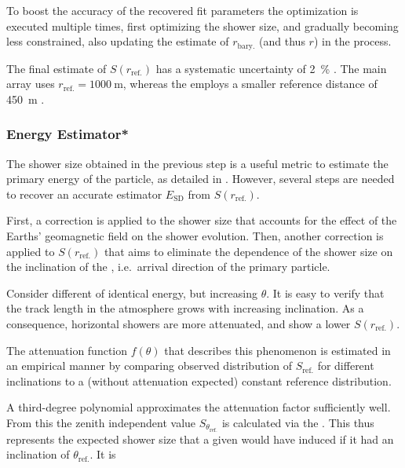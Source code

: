 To boost the accuracy of the recovered fit parameters the optimization is 
executed multiple times, first optimizing the shower size, and gradually 
becoming less constrained, also updating the estimate of $r_\mathrm{bary.}$
(and thus $r$) in the process.

The final estimate of $S(r_\mathrm{ref.})$ has a systematic uncertainty of 
\SI{2}{\percent} \cite{ghiaStatisticalSystematicUncertainties2005}. The main 
array uses $r_\mathrm{ref.} = \SI{1000}{\meter}$, whereas the  employs
a smaller reference distance of \SI{450}{\meter} 
\cite{sanchezAMIGADetectorPierre2011}.

\subsubsection{Energy Estimator*}
\label{sssec:sd-reconstruction-energy-estimator}

The shower size obtained in the previous step is a useful metric to estimate 
the primary energy of the \CR particle, as detailed in 
\cite{aabReconstructionEventsRecorded2020}. However, several steps are needed
to recover an accurate estimator $E_\mathrm{SD}$ from $S(r_\mathrm{ref.})$. 

First, a correction is applied to the shower size that accounts for the effect 
of the Earths' geomagnetic field on the shower evolution. Then, another 
correction is applied to $S(r_\mathrm{ref.})$ that aims to eliminate the 
dependence of the shower size on the inclination of the \EAS, i.e.\ arrival 
direction of the primary particle. 

Consider different \EAS of identical energy, but increasing $\theta$. It is 
easy to verify that the track length in the atmosphere grows with increasing 
inclination. As a consequence, horizontal showers are more attenuated, and show
a lower $S(r_\mathrm{ref.})$. 

The attenuation function $f(\theta)$ that describes this phenomenon is 
estimated in an empirical manner by comparing observed distribution of 
$S_\mathrm{ref.}$ for different inclinations to a (without attenuation 
expected) constant reference distribution. 

A third-degree polynomial approximates the attenuation factor sufficiently 
well. From this the zenith independent value $S_{\theta_\mathrm{ref.}}$ is 
calculated via the \CIC. This thus represents the expected shower size that a 
given \CR would have induced if it had an inclination of 
$\theta_\mathrm{ref.}$. It is

